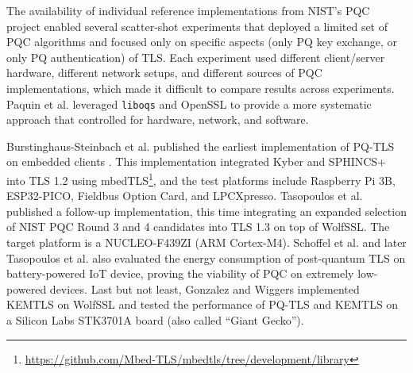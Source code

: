 \documentclass[letterpaper,12pt,titlepage,oneside,final]{book}
\begin{document}
The availability of individual reference implementations from NIST's PQC project enabled several scatter-shot experiments \cite{DBLP:conf/noms/DoringG22,cryptoeprint:2019/1276,DBLP:conf/conext/SikeridisKD20,DBLP:conf/ndss/SikeridisKD20,DBLP:conf/conext/SosnowskiWHSSGC23,DBLP:conf/ipccc/HannaPVPAAA24,DBLP:journals/iacr/KampanakisC24,DBLP:conf/amcis/SabanciC23,DBLP:conf/c2si/McLoughlinGS23,DBLP:journals/iacr/Scott23,DBLP:conf/asiaccs/PaulKLN22,DBLP:conf/conext/SikeridisHOD22,DBLP:conf/cscml/KampanakisK22,DBLP:journals/iacr/PaulKLN21} that deployed a limited set of PQC algorithms and focused only on specific aspects (only PQ key exchange, or only PQ authentication) of TLS.
Each experiment used different client/server hardware, different network setups, and different sources of PQC implementations, which made it difficult to compare results across experiments.
Paquin et al. \cite{DBLP:journals/iacr/PaquinST19,DBLP:conf/pqcrypto/PaquinST20} leveraged \texttt{liboqs} and OpenSSL to provide a more systematic approach that controlled for hardware, network, and software.

Burstinghaus-Steinbach et al. published the earliest implementation of PQ-TLS on embedded clients \cite{DBLP:conf/ccs/Burstinghaus-Steinbach20,DBLP:journals/iacr/Burstinghaus-Steinbach20}.
This implementation integrated Kyber and SPHINCS+ into TLS 1.2 using mbedTLS\footnote{\url{https://github.com/Mbed-TLS/mbedtls/tree/development/library}}, and the test platforms include Raspberry Pi 3B, ESP32-PICO, Fieldbus Option Card, and LPCXpresso.
Tasopoulos et al. \cite{cryptoeprint:2021/1553,DBLP:conf/ispec/GeorgeLFZSS22} published a follow-up implementation, this time integrating an expanded selection of NIST PQC Round 3 and 4 candidates into TLS 1.3 on top of WolfSSL.
The target platform is a NUCLEO-F439ZI (ARM Cortex-M4).
Schoffel et al. \cite{DBLP:conf/iotdi/SchoffelLRW21} and later Tasopoulos et al. \cite{DBLP:journals/iacr/TasopoulosDFZSS23,DBLP:conf/cf/TasopoulosDFZSS23} also evaluated the energy consumption of post-quantum TLS on battery-powered IoT device, proving the viability of PQC on extremely low-powered devices.
Last but not least, Gonzalez and Wiggers \cite{DBLP:conf/space/GonzalezW22} implemented KEMTLS on WolfSSL and tested the performance of PQ-TLS and KEMTLS on a Silicon Labs STK3701A board (also called ``Giant Gecko'').
\end{document}
